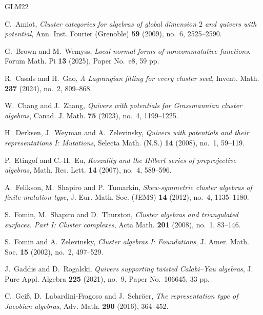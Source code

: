 \documentclass[11pt,letterpaper,reqno]{amsart}
\theoremstyle{definition}
\begin{document}
	
\begin{thebibliography}{GLM22}
\raggedright
		
		C.~Amiot,
		\emph{Cluster categories for algebras of global dimension $2$ and quivers
			with potential},
		Ann. Inst. Fourier (Grenoble) \textbf{59} (2009), no.~6, 2525--2590.
		
		G.~Brown and M.~Wemyss,
		\emph{Local normal forms of noncommutative functions},
		Forum Math. Pi \textbf{13} (2025), Paper No.~e8, 59 pp.
		
		R.~Casals and H.~Gao,
		\emph{A Lagrangian filling for every cluster seed},
		Invent. Math. \textbf{237} (2024), no.~2, 809--868.
		
		W.~Chang and J.~Zhang,
		\emph{Quivers with potentials for Grassmannian cluster algebras},
		Canad. J. Math. \textbf{75} (2023), no.~4, 1199--1225.
		
		H.~Derksen, J.~Weyman and A.~Zelevinsky,
		\emph{Quivers with potentials and their representations I: Mutations},
		Selecta Math. (N.S.) \textbf{14} (2008), no.~1, 59--119.
		
		P.~Etingof and C.-H.~Eu,
		\emph{Koszulity and the Hilbert series of preprojective algebras},
		Math. Res. Lett. \textbf{14} (2007), no.~4, 589--596.
		
		A.~Felikson, M.~Shapiro and P.~Tumarkin,
		\emph{Skew-symmetric cluster algebras of finite mutation type},
		J. Eur. Math. Soc. (JEMS) \textbf{14} (2012), no.~4, 1135--1180.
		
		S.~Fomin, M.~Shapiro and D.~Thurston,
		\emph{Cluster algebras and triangulated surfaces. Part I: Cluster
			complexes},
		Acta Math. \textbf{201} (2008), no.~1, 83--146.
		
		S.~Fomin and A.~Zelevinsky,
		\emph{Cluster algebras I: Foundations},
		J. Amer. Math. Soc. \textbf{15} (2002), no.~2, 497--529.
		
		J.~Gaddis and D.~Rogalski,
		\emph{Quivers supporting twisted Calabi--Yau algebras},
		J. Pure Appl. Algebra \textbf{225} (2021), no.~9,
		Paper No.~106645, 33 pp.
		
		C.~Gei{\ss}, D.~Labardini-Fragoso and J.~Schr\"oer,
		\emph{The representation type of Jacobian algebras},
		Adv. Math. \textbf{290} (2016), 364--452.
		

\end{thebibliography}
\end{document}

